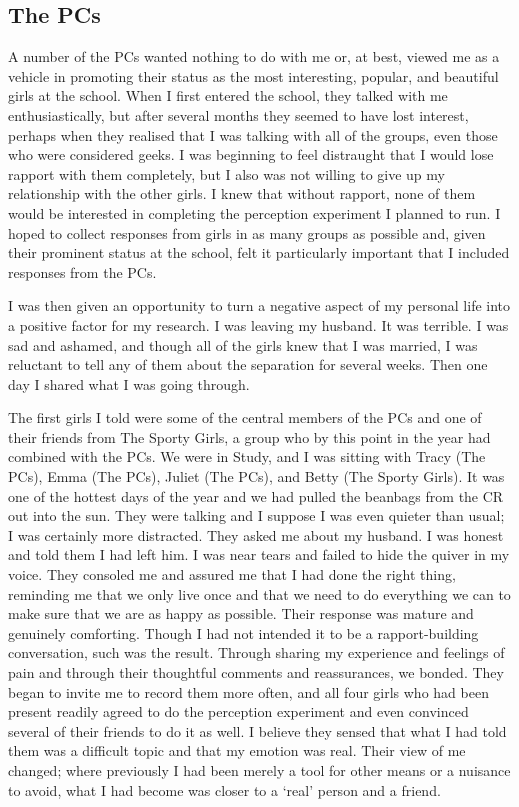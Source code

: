 \subsection{The PCs}
A number of the PCs wanted nothing to do with me or, at best, viewed me as a vehicle in promoting their status as the most interesting, popular, and beautiful girls at the school.  When I first entered the school, they talked with me enthusiastically, but after several months they seemed to have lost interest, perhaps when they realised that I was talking with all of the groups, even those who were considered geeks.  I was beginning to feel distraught that I would lose rapport with them completely, but I also was not willing to give up my relationship with the other girls.  I knew that without rapport, none of them would be interested in completing the perception experiment I planned to run.  I hoped to collect responses from girls in as many groups as possible and, given their prominent status at the school, felt it particularly important that I included responses from the PCs.

I was then given an opportunity to turn a negative aspect of my personal life into a positive factor for my research. I was leaving my husband.  It was terrible.  I was sad and ashamed, and though all of the girls knew that I was married, I was reluctant to tell any of them about the separation for several weeks.  Then one day I shared what I was going through.  

The first girls I told were some of the central members of the PCs and one of their friends from The Sporty Girls, a group who by this point in the year had combined with the PCs.  We were in Study, and I was sitting with Tracy (The PCs), Emma (The PCs), Juliet (The PCs), and Betty (The Sporty Girls).  It was one of the hottest days of the year and we had pulled the beanbags from the CR out into the sun.  They were talking and I suppose I was even quieter than usual; I was certainly more distracted.  They asked me about my husband.  I was honest and told them I had left him.  I was near tears and failed to hide the quiver in my voice.  They consoled me and assured me that I had done the right thing, reminding me that we only live once and that we need to do everything we can to make sure that we are as happy as possible.  Their response was mature and genuinely comforting.  Though I had not intended it to be a rapport-building conversation, such was the result.  Through sharing my experience and feelings of pain and through their thoughtful comments and reassurances, we bonded.  They began to invite me to record them more often, and all four girls who had been present readily agreed to do the perception experiment and even convinced several of their friends to do it as well.  I believe they sensed that what I had told them was a difficult topic and that my emotion was real.  Their view of me changed; where previously I had been merely a tool for other means or a nuisance to avoid, what I had become was closer to a `real' person and a friend.

